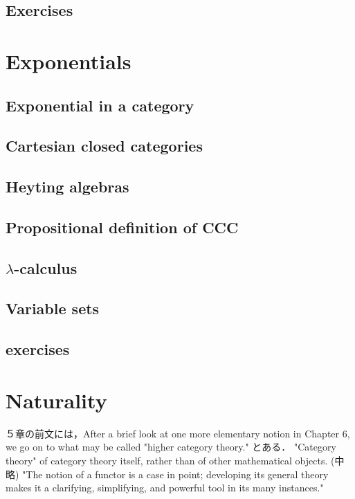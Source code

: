 \documentclass[uplatex, dvipdfmx]{jsarticle}
\begin{document}
\subsection{Exercises}

\section{Exponentials}

\subsection{Exponential in a category}

\subsection{Cartesian closed categories}

\subsection{Heyting algebras}

\subsection{Propositional definition of CCC}

\subsection{$\lambda$-calculus}

\subsection{Variable sets}

\subsection{exercises}

\section{Naturality}
５章の前文には，After a brief look at one more elementary notion in Chapter 6, we go on to what may be called "higher category theory." とある．
"Category theory" of category theory itself, rather than of other mathematical objects. (中略) "The notion of a functor is a case in point; developing its general theory makes it a clarifying, simplifying, and powerful tool in its many instances."
\end{document}
